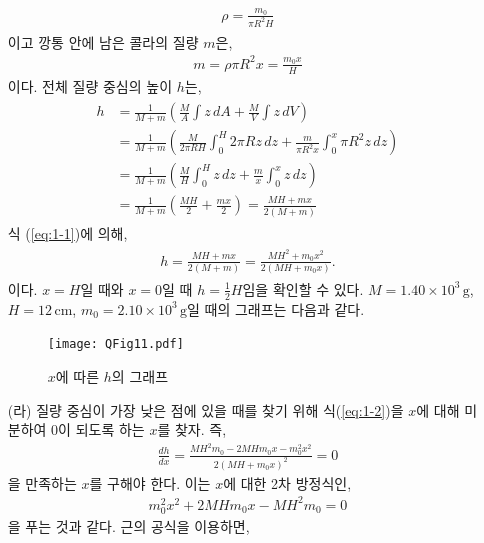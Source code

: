 \documentclass[floatfix,nofootinbib,superscriptaddress,fleqn]{revtex4-2}
\begin{document}
\begin{itemize}
\begin{align}
    \begin{split}
      \rho = \frac{m_0}{\pi R^2 H}
    \end{split}
  \end{align}
  이고 깡통 안에 남은 콜라의 질량 $m$은,
  \begin{align}\label{eq:1-1}
    m= \rho\pi R^2 x = \frac{m_0x}{H}
  \end{align}
  이다.
  전체 질량 중심의 높이 $h$는,
  \begin{align}
    \begin{split}
      h &= \frac{1}{M+m}\left(\frac{M}{A}\int z\,dA
      +\frac{M}{V}\int z\,dV\right) \\
      &= \frac{1}{M+m}\left(\frac{M}{2\pi R H}\int_0^H 2\pi R z\,dz
      +\frac{m}{\pi R^2 x}\int_0^x\pi R^2 z\,dz\right)  \\
      &= \frac{1}{M+m}\left(\frac{M}{H}\int_0^H z\,dz
      +\frac{m}{x}\int_0^x z\,dz\right) \\
      &= \frac{1}{M+m}\left(\frac{MH}{2}
      +\frac{mx}{2}\right) = \frac{MH+mx}{2(M+m)}
    \end{split}
  \end{align}
  식 (\ref{eq:1-1})에 의해,
  \begin{align}\label{eq:1-2}
    \begin{split}
      h = \frac{MH+mx}{2(M+m)}=\frac{MH^2+m_0x^2}{2(MH+m_0x)}.
    \end{split}
  \end{align}
  이다. $x=H$일 때와 $x=0$일 때 $h=\frac{1}{2}H$임을 확인할 수 있다.
  $M=1.40\times 10^{3}\,\mathrm{g}$, $H=12\,\mathrm{cm}$,
  $m_0=2.10\times 10^3\,\mathrm{g}$일 때의 그래프는 다음과 같다.
  \begin{figure}[htbp]
    \centering
    \texttt{[image: QFig11.pdf]}
    \caption{$x$에 따른 $h$의 그래프}
    \label{<label>}
  \end{figure}
  \item[(라)] 질량 중심이 가장 낮은 점에 있을 때를 찾기 위해 식(\ref{eq:1-2})을 
  $x$에 대해 미분하여 0이 되도록 하는 $x$를 찾자. 즉,
  \begin{align}
    \frac{dh}{dx} = \frac{MH^2m_0-2MHm_0x-m_0^2x^2}{2(MH+m_0x)^2} = 0
  \end{align}
  을 만족하는 $x$를 구해야 한다. 이는 $x$에 대한 2차 방정식인,
  \begin{align}
    m_0^2x^2 +2MHm_0x -MH^2m_0 = 0 
  \end{align}
  을 푸는 것과 같다. 근의 공식을 이용하면,
  \begin{align}

\end{align}
\end{itemize}
\end{document}
